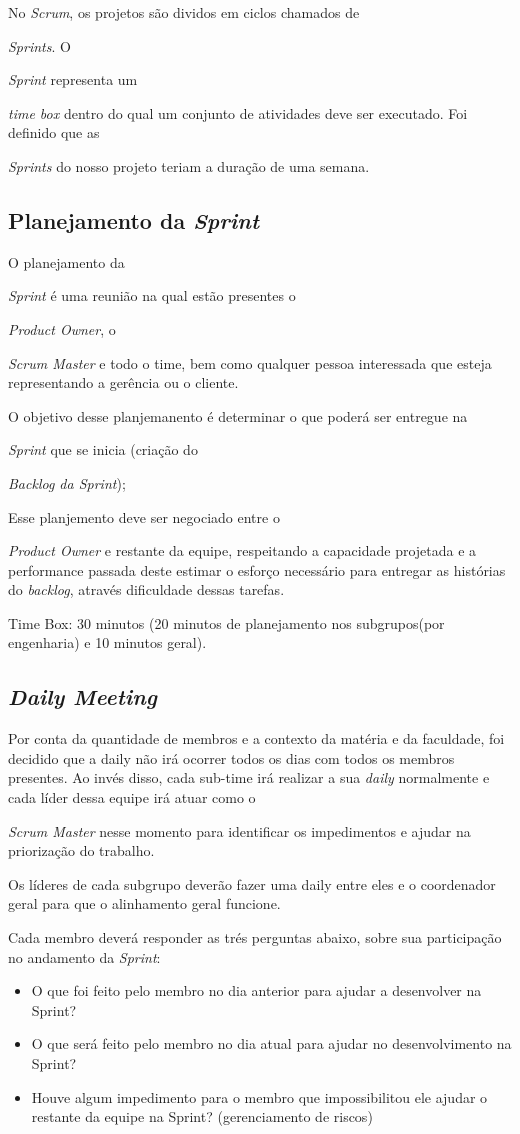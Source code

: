No \emph{Scrum}, os projetos são dividos em ciclos chamados de {\emph{Sprints}. O {\emph{Sprint} representa um {\emph{time box} dentro do qual um conjunto 
de atividades deve ser executado. Foi definido que as {\emph{Sprints} do nosso projeto teriam a duração de uma semana. 

\subsection{Planejamento da \emph{Sprint}}

O planejamento da {\emph{Sprint} é uma reunião na qual estão presentes o {\emph{Product Owner}, o {\emph{Scrum Master} e todo o time, 
bem como qualquer pessoa interessada que esteja representando a gerência ou o cliente.

O objetivo desse planjemanento é determinar o que poderá ser entregue na {\emph{Sprint} que se inicia (criação do {\emph{Backlog da Sprint});

Esse planjemento deve ser negociado entre o {\emph{Product Owner} e restante da equipe, respeitando a capacidade projetada e a performance passada deste
estimar o esforço necessário para entregar as histórias do \emph{backlog}, através dificuldade dessas tarefas. 

Time Box: 30 minutos (20 minutos de planejamento nos subgrupos(por engenharia) e 10 minutos geral).

\subsection{\emph{Daily Meeting}}

Por conta da quantidade de membros e a contexto da matéria e da faculdade, foi decidido que a daily não irá ocorrer todos os dias com todos os membros presentes. 
Ao invés disso, cada sub-time irá realizar a sua \emph{daily} normalmente e cada líder dessa equipe irá atuar como o {\emph{Scrum Master}
nesse momento para identificar os impedimentos e ajudar na priorização do trabalho.

Os líderes de cada subgrupo deverão fazer uma daily entre eles e o coordenador geral para que o alinhamento geral funcione. 

Cada membro deverá responder as trés perguntas abaixo, sobre sua participação no andamento da \emph{Sprint}:

\begin{itemize}
    \item O que foi feito pelo membro no dia anterior para ajudar a desenvolver na Sprint?
    \item O que será feito pelo membro no dia atual para ajudar no desenvolvimento na Sprint?
    \item Houve algum impedimento para o membro que impossibilitou ele ajudar o restante da equipe na Sprint? (gerenciamento de riscos)
\end{itemize}

}}}}}}}}}}}

